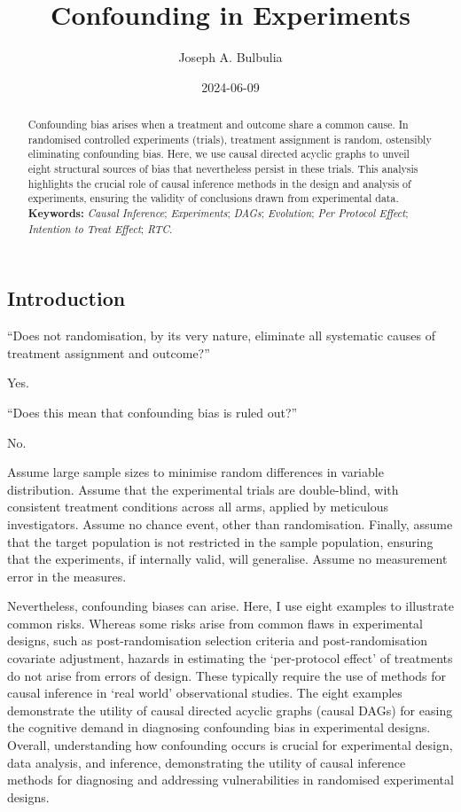 \documentclass[
  single column]{article}
\title{Confounding in Experiments}
\author{Joseph A. Bulbulia}
\affil{%
             \small{     Victoria University of Wellington, New Zealand
          ORCID \textcolor[HTML]{A6CE39}{\aiOrcid} ~0000-0002-5861-2056 }
              }
\date{2024-06-09}
\begin{document}
\maketitle
\begin{abstract}
Confounding bias arises when a treatment and outcome share a common
cause. In randomised controlled experiments (trials), treatment
assignment is random, ostensibly eliminating confounding bias. Here, we
use causal directed acyclic graphs to unveil eight structural sources of
bias that nevertheless persist in these trials. This analysis highlights
the crucial role of causal inference methods in the design and analysis
of experiments, ensuring the validity of conclusions drawn from
experimental data. \textbf{Keywords:} \emph{Causal Inference};
\emph{Experiments}; \emph{DAGs}; \emph{Evolution}; \emph{Per Protocol
Effect}; \emph{Intention to Treat Effect}; \emph{RTC}.
\end{abstract}

\subsection{Introduction}\label{introduction}

``Does not randomisation, by its very nature, eliminate all systematic
causes of treatment assignment and outcome?''

Yes.

``Does this mean that confounding bias is ruled out?''

No.

Assume large sample sizes to minimise random differences in variable
distribution. Assume that the experimental trials are double-blind, with
consistent treatment conditions across all arms, applied by meticulous
investigators. Assume no chance event, other than randomisation.
Finally, assume that the target population is not restricted in the
sample population, ensuring that the experiments, if internally valid,
will generalise. Assume no measurement error in the measures.

Nevertheless, confounding biases can arise. Here, I use eight examples
to illustrate common risks. Whereas some risks arise from common flaws
in experimental designs, such as post-randomisation selection criteria
and post-randomisation covariate adjustment, hazards in estimating the
`per-protocol effect' of treatments do not arise from errors of design.
These typically require the use of methods for causal inference in `real
world' observational studies. The eight examples demonstrate the utility
of causal directed acyclic graphs (causal DAGs) for easing the cognitive
demand in diagnosing confounding bias in experimental designs. Overall,
understanding how confounding occurs is crucial for experimental design,
data analysis, and inference, demonstrating the utility of causal
inference methods for diagnosing and addressing vulnerabilities in
randomised experimental designs.
\end{document}
